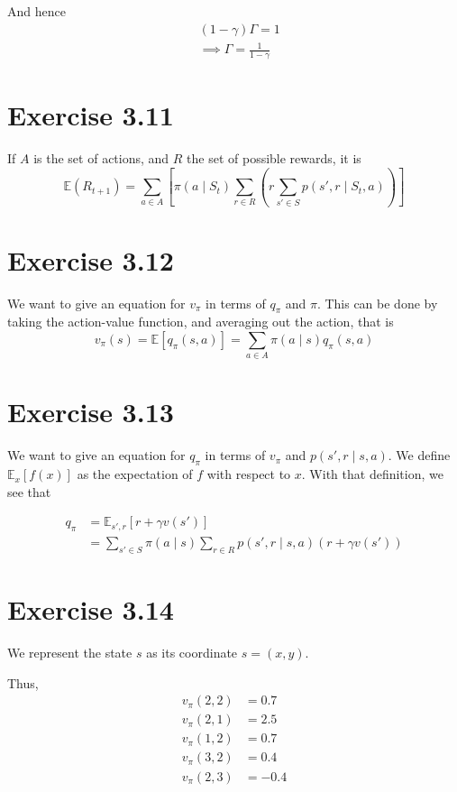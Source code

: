 \documentclass[a4paper,11pt,reqno]{amsart}
\begin{document}
And hence
\begin{align}
    &(1 - \gamma ) \Gamma =1\\
    & \implies \Gamma = \frac{1}{1 - \gamma }
\end{align}

\section*{Exercise 3.11}
If $A$ is the set of actions, and $R$ the set of possible rewards, it is
\[
    \mathbb{E}(R _{t +1}) = \sum_{a \in A} \left[ \pi (a \mid S_t) 
        \sum_{r \in R} \left( r \sum_{s' \in S} p(s',r \mid S_t ,a) \right) 
    \right] 
\]

\section*{Exercise 3.12}
We want to give an equation for $v _{\pi }$ in terms of $q _{\pi }$ and $\pi $. This can be done by taking the action-value function, and averaging out the action, that is
\[
    v _{\pi }(s) = \mathbb{E} \left[ q _{\pi }(s, a) \right] = \sum_{a \in A} \pi (a \mid s) q _{\pi }(s, a)

\]

\section*{Exercise 3.13}
We want to give an equation for $q _{\pi }$ in terms of $v _{\pi }$ and $p(s',r \mid s,a)$. We define $\mathbb{E} _{x} \left[ f(x) \right] $ as the expectation of $f$ with respect to $x$. With that definition, we see that

\begin{align}
    q _{\pi }&= \mathbb{E} _{s', r} \left[ r + \gamma v(s') \right] \\
    &= \sum_{s' \in S} \pi (a \mid s) \sum_{r \in R} p(s', r \mid s, a)(r + \gamma v(s'))
\end{align}

\section*{Exercise 3.14}

We represent the state $s$ as its coordinate $s = (x, y)$. 

Thus,
\begin{align}
    v _{\pi }(2, 2) &= 0.7\\
    v _{\pi }(2, 1) &= 2.5\\
    v _{\pi} (1, 2) &= 0.7 \\
    v _{\pi }(3,2) &= 0.4\\
    v _{\pi }(2, 3) &= -0.4
\end{align}
\end{document}
